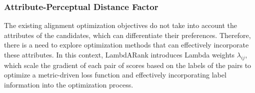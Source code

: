 \subsubsection{Attribute-Perceptual Distance Factor}
The existing alignment optimization objectives \cite{rafailov2024direct, song2024preference} do not take into account the attributes of the candidates, which can differentiate their preferences. 
Therefore, there is a need to explore optimization methods that can effectively incorporate these attributes.
In this context, LambdARank \cite{burges2005learning, donmez2009local, wang2018lambdaloss, jagerman2022optimizing} introduces Lambda weights \(\lambda_{ij}\), which scale the gradient of each pair of scores based on the labels of the pairs to optimize a metric-driven loss function and effectively incorporating label information into the optimization process.

